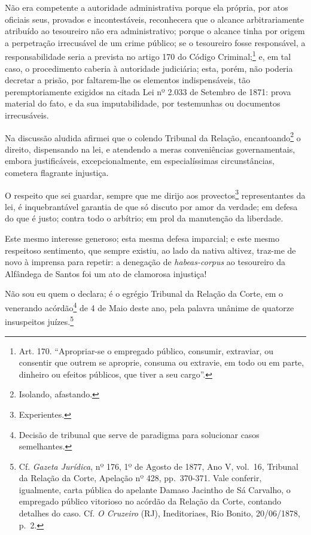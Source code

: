 Não era competente a autoridade administrativa porque ela própria, por
atos oficiais seus, provados e incontestáveis, reconhecera que o alcance
arbitrariamente atribuído ao tesoureiro não era administrativo; porque o
alcance tinha por origem a perpetração irrecusável de um crime público;
se o tesoureiro fosse responsável, a responsabilidade seria a prevista
no artigo 170 do Código Criminal;\footnote{Art. 170. ``Apropriar-se o
  empregado público, consumir, extraviar, ou consentir que outrem se
  aproprie, consuma ou extravie, em todo ou em parte, dinheiro ou
  efeitos públicos, que tiver a seu cargo''.} e, em tal caso, o
procedimento caberia à autoridade judiciária; esta, porém, não poderia
decretar a prisão, por faltarem-lhe os elementos indispensáveis, tão
peremptoriamente exigidos na citada Lei nº 2.033 de Setembro de 1871:
prova material do fato, e da sua imputabilidade, por testemunhas ou
documentos irrecusáveis.

Na discussão aludida afirmei que o colendo Tribunal da Relação,
encantoando\footnote{Isolando, afastando.} o direito, dispensando na
lei, e atendendo a meras conveniências governamentais, embora
justificáveis, excepcionalmente, em especialíssimas circunstâncias,
cometera flagrante injustiça.

O respeito que sei guardar, sempre que me dirijo aos provectos\footnote{Experientes.}
representantes da lei, é inquebrantável garantia de que só discuto por
amor da verdade; em defesa do que é justo; contra todo o arbítrio; em
prol da manutenção da liberdade.

Este mesmo interesse generoso; esta mesma defesa imparcial; e este mesmo
respeitoso sentimento, que sempre existiu, ao lado da nativa altivez,
traz-me de novo à imprensa para repetir: a denegação de
\emph{habeas-corpus} ao tesoureiro da Alfândega de Santos foi um ato de
clamorosa injustiça!

Não sou eu quem o declara; é o egrégio Tribunal da Relação da Corte, em
o venerando acórdão\footnote{Decisão de tribunal que serve de paradigma
  para solucionar casos semelhantes.} de 4 de Maio deste ano, pela
palavra unânime de quatorze insuspeitos juízes.\footnote{Cf.
  \emph{Gazeta Jurídica}, nº 176, 1º de Agosto de 1877, Ano V, vol.~16,
  Tribunal da Relação da Corte, Apelação nº 428, pp.~370-371. Vale
  conferir, igualmente, carta pública do apelante Damaso Jacintho de Sá
  Carvalho, o empregado público vitorioso no acórdão da Relação da
  Corte, contando detalhes do caso. Cf. \emph{O Cruzeiro} (RJ),
  Ineditoriaes, Rio Bonito, 20/06/1878, p.~2.}

